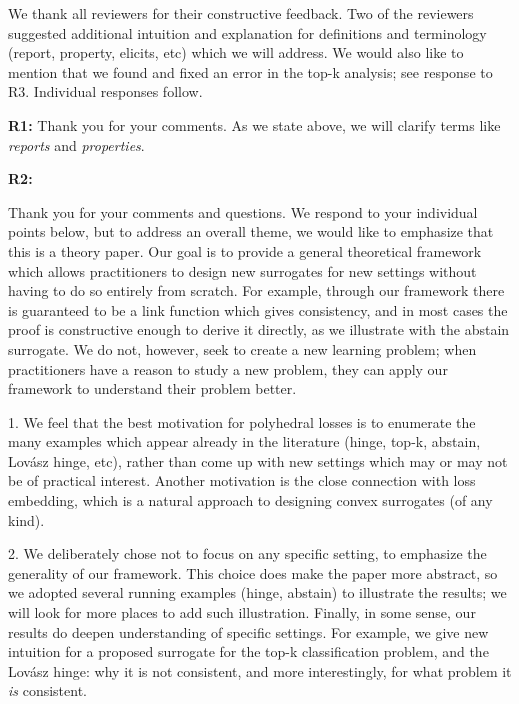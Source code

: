 \documentclass{article}
\begin{document}
We thank all reviewers for their constructive feedback. 
Two of the reviewers suggested additional intuition and explanation for definitions and terminology (report, property, elicits, etc) which we will address.
We would also like to mention that we found and fixed an error in the top-k analysis; see response to R3.
Individual responses follow.

\textbf{R1:}
Thank you for your comments.
As we state above, we will clarify terms like \emph{reports} and \emph{properties}.

\textbf{R2:}

Thank you for your comments and questions.
We respond to your individual points below, but to address an overall theme, we would like to emphasize that this is a theory paper.
Our goal is to provide a general theoretical framework which allows practitioners to design new surrogates for new settings without having to do so entirely from scratch.
For example, through our framework there is guaranteed to be a link function which gives consistency, and in most cases the proof is constructive enough to derive it directly, as we illustrate with the abstain surrogate.
We do not, however, seek to create a new learning problem; when practitioners have a reason to study a new problem, they can apply our framework to understand their problem better.

1. We feel that the best motivation for polyhedral losses is to enumerate the many examples which appear already in the literature (hinge, top-k, abstain, Lov\'asz hinge, etc), rather than come up with new settings which may or may not be of practical interest.
Another motivation is the close connection with loss embedding, which is a natural approach to designing convex surrogates (of any kind).

2. We deliberately chose not to focus on any specific setting, to emphasize the generality of our framework.
This choice does make the paper more abstract, so we adopted several running examples (hinge, abstain) to illustrate the results; we will look for more places to add such illustration.
Finally, in some sense, our results do deepen understanding of specific settings.
For example, we give new intuition for a proposed surrogate for the top-k classification problem, and the Lov\'asz hinge: why it is not consistent, and more interestingly, for what problem it \emph{is} consistent.

\end{document}
